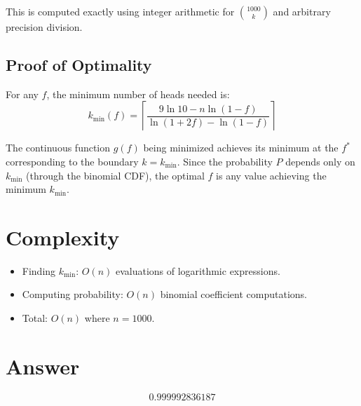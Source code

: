 \documentclass[12pt]{article}
\begin{document}
This is computed exactly using integer arithmetic for $\binom{1000}{k}$ and arbitrary precision division.

\subsection{Proof of Optimality}
For any $f$, the minimum number of heads needed is:
\[ k_{\min}(f) = \left\lceil \frac{9\ln 10 - n\ln(1-f)}{\ln(1+2f) - \ln(1-f)} \right\rceil \]

The continuous function $g(f)$ being minimized achieves its minimum at the $f^*$ corresponding to the boundary $k = k_{\min}$. Since the probability $P$ depends only on $k_{\min}$ (through the binomial CDF), the optimal $f$ is any value achieving the minimum $k_{\min}$.

\section{Complexity}
\begin{itemize}
    \item Finding $k_{\min}$: $O(n)$ evaluations of logarithmic expressions.
    \item Computing probability: $O(n)$ binomial coefficient computations.
    \item Total: $O(n)$ where $n = 1000$.
\end{itemize}

\section{Answer}

\[
\boxed{0.999992836187}
\]
\end{document}
